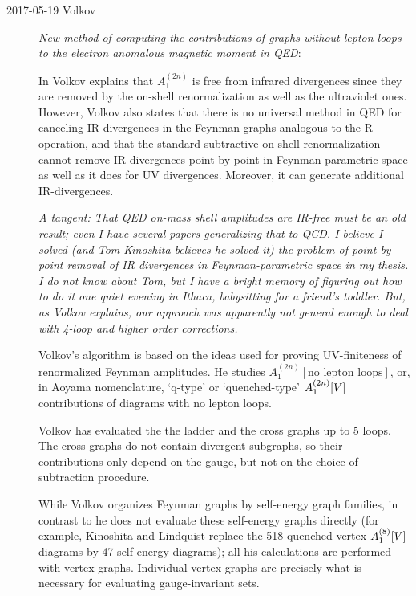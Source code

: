 \begin{description}
\item[2017-05-19 Volkov]
{\em New method of computing the contributions of graphs without lepton
loops to the electron anomalous magnetic moment in {QED}}:

In  Volkov explains that $A_1^{(2n)}$ is free from
infrared divergences since they are removed by the on-shell
renormalization as well as the ultraviolet ones.
However, Volkov also states that there is no universal
method in QED for canceling IR divergences in the
Feynman graphs analogous to the R operation, and
that the standard subtractive on-shell renormalization cannot remove
IR divergences point-by-point in Feynman-parametric space as well as it
does for UV divergences. Moreover, it can generate additional
IR-divergences.

    {\em
    A tangent:
    That QED on-mass shell amplitudes are IR-free must be an old result;
    even I have several papers generalizing that to
    QCD. I believe I solved (and
    Tom Kinoshita believes he solved it) the problem of point-by-point
    removal of IR divergences in Feynman-parametric space in my
    thesis. I do not know about Tom, but I have a bright
    memory of figuring out how to do it one quiet evening in Ithaca,
    babysitting for a friend's toddler. But, as Volkov
    explains, our approach was apparently not general enough
    to deal with 4-loop and higher order corrections.
     }

Volkov's algorithm is based on the ideas used for proving UV-finiteness
of renormalized Feynman amplitudes.
He studies $A_1^{(2n)}[\text{no lepton loops}]$, or, in Aoyama
\etal{} nomenclature, `q-type' or `quenched-type'
$A_1^{(2n)}[V]$ contributions of diagrams with no lepton loops.

Volkov  has evaluated the the ladder
and the cross graphs
up to 5 loops. The cross graphs do not contain divergent subgraphs, so
their contributions only depend on the gauge, but not on the choice of
subtraction procedure.

While Volkov organizes Feynman graphs by self-energy graph families, in
contrast to  he does
not evaluate these self-energy graphs directly
(for example, Kinoshita and Lindquist replace the 518
quenched vertex $A_1^{(8)}[V]$ diagrams by 47 self-energy diagrams);
all his calculations are performed with vertex graphs. Individual  vertex
graphs are precisely what is  necessary for evaluating gauge-invariant
sets.



\end{description}

